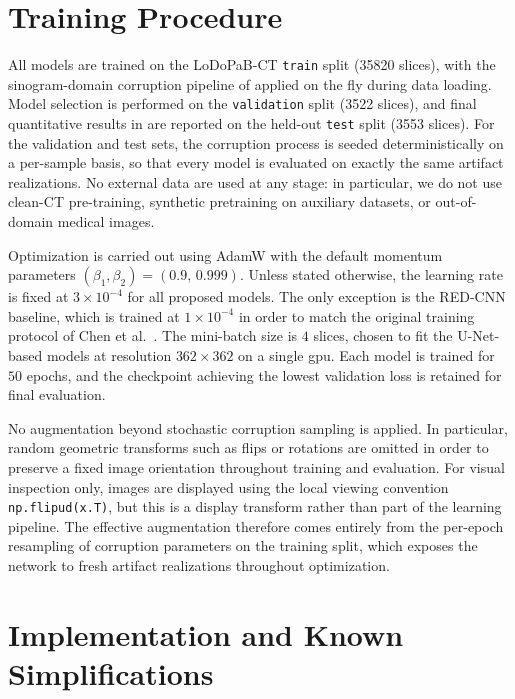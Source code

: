 \section{Training Procedure}
\label{sec:meth_training}

All models are trained on the \mbox{LoDoPaB-CT} \texttt{train} split (\num{35820} slices), with the sinogram-domain corruption pipeline of  applied on the fly during data loading. Model selection is performed on the \texttt{validation} split (\num{3522} slices), and final quantitative results in  are reported on the held-out \texttt{test} split (\num{3553} slices). For the validation and test sets, the corruption process is seeded deterministically on a per-sample basis, so that every model is evaluated on exactly the same artifact realizations. No external data are used at any stage: in particular, we do not use clean-CT pre-training, synthetic pretraining on auxiliary datasets, or out-of-domain medical images.

Optimization is carried out using AdamW with the default momentum parameters $(\beta_{1}, \beta_{2}) = (0.9,\,0.999)$. Unless stated otherwise, the learning rate is fixed at $3\times 10^{-4}$ for all proposed models. The only exception is the RED-CNN baseline, which is trained at $1\times 10^{-4}$ in order to match the original training protocol of Chen et al.~\cite{Chen2017}. The mini-batch size is $4$ slices, chosen to fit the U-Net-based models at resolution $362\times 362$ on a single \gls{gpu}. Each model is trained for $50$ epochs, and the checkpoint achieving the lowest validation loss is retained for final evaluation.

No augmentation beyond stochastic corruption sampling is applied. In particular, random geometric transforms such as flips or rotations are omitted in order to preserve a fixed image orientation throughout training and evaluation. For visual inspection only, images are displayed using the local viewing convention \texttt{np.flipud(x.T)}, but this is a display transform rather than part of the learning pipeline. The effective augmentation therefore comes entirely from the per-epoch resampling of corruption parameters on the training split, which exposes the network to fresh artifact realizations throughout optimization.

\section{Implementation and Known Simplifications}
\label{sec:meth_implementation}

